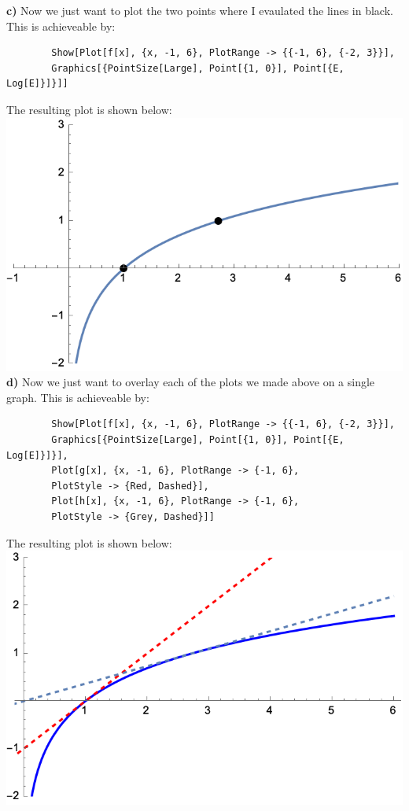 \documentclass{article}
\begin{document}
    \textbf{c)} Now we just want to plot the two points where I evaulated the lines in black. This is achieveable by: \\
    \begin{verbatim}
        Show[Plot[f[x], {x, -1, 6}, PlotRange -> {{-1, 6}, {-2, 3}}], 
        Graphics[{PointSize[Large], Point[{1, 0}], Point[{E, Log[E]}]}]]
    \end{verbatim}
    The resulting plot is shown below: \\   
    \includegraphics[scale=0.5]{2.2.1c.png} \\


    \textbf{d)} Now we just want to overlay each of the plots we made above on a single graph. This is achieveable by: \\
    \begin{verbatim}
        Show[Plot[f[x], {x, -1, 6}, PlotRange -> {{-1, 6}, {-2, 3}}], 
        Graphics[{PointSize[Large], Point[{1, 0}], Point[{E, Log[E]}]}], 
        Plot[g[x], {x, -1, 6}, PlotRange -> {-1, 6}, 
        PlotStyle -> {Red, Dashed}], 
        Plot[h[x], {x, -1, 6}, PlotRange -> {-1, 6}, 
        PlotStyle -> {Grey, Dashed}]]
    \end{verbatim}
    \vfill 
    \newpage
    The resulting plot is shown below: \\
    \includegraphics[scale=0.5]{2.2.1d.png} \\
\end{document}
